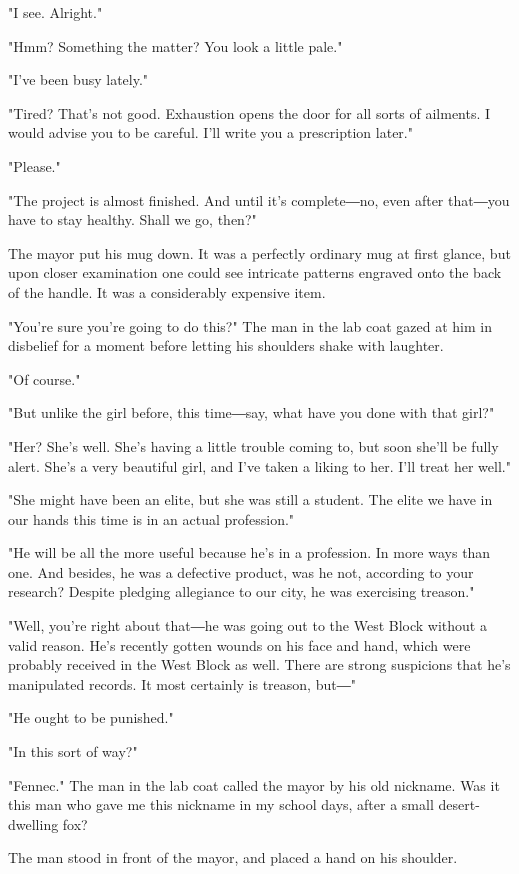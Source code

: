 "I see. Alright."

"Hmm? Something the matter? You look a little pale."

"I've been busy lately."

"Tired? That's not good. Exhaustion opens the door for all sorts of
ailments. I would advise you to be careful. I'll write you a
prescription later."

"Please."

"The project is almost finished. And until it's complete―no, even after
that―you have to stay healthy. Shall we go, then?"

The mayor put his mug down. It was a perfectly ordinary mug at first
glance, but upon closer examination one could see intricate patterns
engraved onto the back of the handle. It was a considerably expensive
item.

"You're sure you're going to do this?" The man in the lab coat gazed at
him in disbelief for a moment before letting his shoulders shake with
laughter.

"Of course."

"But unlike the girl before, this time―say, what have you done with that
girl?"

"Her? She's well. She's having a little trouble coming to, but soon
she'll be fully alert. She's a very beautiful girl, and I've taken a
liking to her. I'll treat her well."

"She might have been an elite, but she was still a student. The elite we
have in our hands this time is in an actual profession."

"He will be all the more useful because he's in a profession. In more
ways than one. And besides, he was a defective product, was he not,
according to your research? Despite pledging allegiance to our city, he
was exercising treason."

"Well, you're right about that―he was going out to the West Block
without a valid reason. He's recently gotten wounds on his face and
hand, which were probably received in the West Block as well. There are
strong suspicions that he's manipulated records. It most certainly is
treason, but―"

"He ought to be punished."

"In this sort of way?"

"Fennec." The man in the lab coat called the mayor by his old nickname.
Was it this man who gave me this nickname in my school days, after a
small desert-dwelling fox?

The man stood in front of the mayor, and placed a hand on his shoulder.

